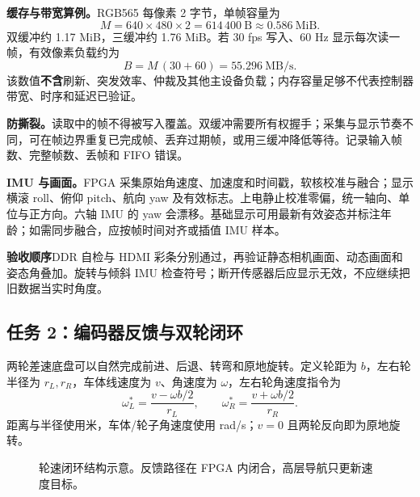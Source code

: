 \documentclass[UTF8,a4paper,zihao=-4,fontset=fandol]{ctexart}
\newcommand{\note}[2]{\par\smallskip\noindent\colorbox{Pale}{\parbox{\dimexpr\linewidth-2\fboxsep\relax}{\small\textbf{\color{Teal}#1}\quad #2}}\par\smallskip}
\newcommand{\nextpage}{\clearpage}
\begin{document}
\textbf{缓存与带宽算例。}RGB565 每像素 2 字节，单帧容量为
\[
 M=640\times480\times2=614\,400\ \mathrm{B}\approx0.586\ \mathrm{MiB}.
\]
双缓冲约 1.17 MiB，三缓冲约 1.76 MiB。若 30 fps 写入、60 Hz 显示每次读一帧，有效像素负载约为
\[
 B=M\,(30+60)=55.296\ \mathrm{MB/s}.
\]
该数值\textbf{不含}刷新、突发效率、仲裁及其他主设备负载；内存容量足够不代表控制器带宽、时序和延迟已验证。

\textbf{防撕裂。}读取中的帧不得被写入覆盖。双缓冲需要所有权握手；采集与显示节奏不同，可在帧边界重复已完成帧、丢弃过期帧，或用三缓冲降低等待。记录输入帧数、完整帧数、丢帧和 FIFO 错误。

\textbf{IMU 与画面。}FPGA 采集原始角速度、加速度和时间戳，软核校准与融合；显示横滚 roll、俯仰 pitch、航向 yaw 及有效标志。上电静止校准零偏，统一轴向、单位与正方向。六轴 IMU 的 yaw 会漂移。基础显示可用最新有效姿态并标注年龄；如需同步融合，应按帧时间对齐或插值 IMU 样本。

\note{验收顺序}{DDR 自检与 HDMI 彩条分别通过，再验证静态相机画面、动态画面和姿态角叠加。旋转与倾斜 IMU 检查符号；断开传感器后应显示无效，不应继续把旧数据当实时角度。}

\nextpage
\subsection{任务 2：编码器反馈与双轮闭环}

两轮差速底盘可以自然完成前进、后退、转弯和原地旋转。定义轮距为 $b$，左右轮半径为 $r_L,r_R$，车体线速度为 $v$、角速度为 $\omega$，左右轮角速度指令为
\[
 \omega_L^*=\frac{v-\omega b/2}{r_L},\qquad
 \omega_R^*=\frac{v+\omega b/2}{r_R}.
\]
距离与半径使用米，车体/轮子角速度使用 rad/s；$v=0$ 且两轮反向即为原地旋转。

\begin{figure}[H]\centering
{}
\caption{轮速闭环结构示意。反馈路径在 FPGA 内闭合，高层导航只更新速度目标。}\label{fig:control}
\end{figure}
\end{document}
